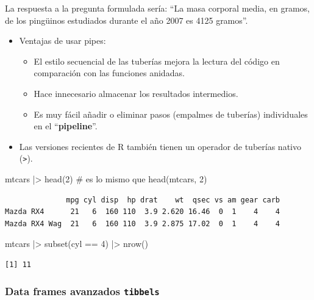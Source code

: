 \documentclass[
  letterpaper,
  DIV=11,
  numbers=noendperiod]{scrreprt}
\newenvironment{Shaded}{\begin{snugshade}}{\end{snugshade}}
\newcommand{\CommentTok}[1]{\textcolor[rgb]{0.37,0.37,0.37}{#1}}
\newcommand{\DecValTok}[1]{\textcolor[rgb]{0.68,0.00,0.00}{#1}}
\newcommand{\FunctionTok}[1]{\textcolor[rgb]{0.28,0.35,0.67}{#1}}
\newcommand{\NormalTok}[1]{\textcolor[rgb]{0.00,0.23,0.31}{#1}}
\newcommand{\SpecialCharTok}[1]{\textcolor[rgb]{0.37,0.37,0.37}{#1}}
\begin{document}
La respuesta a la pregunta formulada sería: ``La masa corporal media, en
gramos, de los pingüinos estudiados durante el año 2007 es 4125
gramos''.

\begin{itemize}
\item
  Ventajas de usar pipes:

  \begin{itemize}
  \item
    El estilo secuencial de las tuberías mejora la lectura del código en
    comparación con las funciones anidadas.
  \item
    Hace innecesario almacenar los resultados intermedios.
  \item
    Es muy fácil añadir o eliminar pasos (empalmes de tuberías)
    individuales en el ``\textbf{pipeline}''.
  \end{itemize}
\item
  Las versiones recientes de R también tienen un operador de tuberías
  nativo (\texttt{\textbar{}\textgreater{}}).
\end{itemize}

\begin{Shaded}
\begin{Highlighting}[]
\NormalTok{mtcars }\SpecialCharTok{|\textgreater{}} \FunctionTok{head}\NormalTok{(}\DecValTok{2}\NormalTok{) }\CommentTok{\#  es lo mismo que  head(mtcars, 2)}
\end{Highlighting}
\end{Shaded}

\begin{verbatim}
              mpg cyl disp  hp drat    wt  qsec vs am gear carb
Mazda RX4      21   6  160 110  3.9 2.620 16.46  0  1    4    4
Mazda RX4 Wag  21   6  160 110  3.9 2.875 17.02  0  1    4    4
\end{verbatim}

\begin{Shaded}
\begin{Highlighting}[]
\NormalTok{mtcars }\SpecialCharTok{|\textgreater{}} \FunctionTok{subset}\NormalTok{(cyl }\SpecialCharTok{==} \DecValTok{4}\NormalTok{) }\SpecialCharTok{|\textgreater{}} \FunctionTok{nrow}\NormalTok{()  }
\end{Highlighting}
\end{Shaded}

\begin{verbatim}
[1] 11
\end{verbatim}

\hypertarget{data-frames-avanzados-tibbels}{%
\subsubsection{\texorpdfstring{Data frames avanzados
\texttt{tibbels}}{Data frames avanzados tibbels}}\label{data-frames-avanzados-tibbels}}
\end{document}
